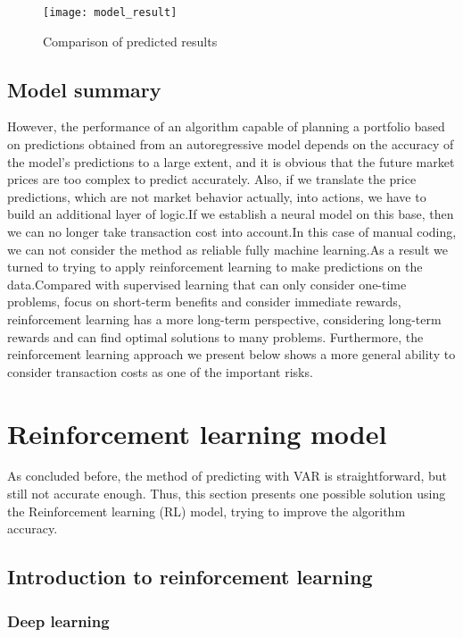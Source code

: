 \documentclass{mcmthesis}
\begin{document}
\begin{figure}[H]
  \centering
  \texttt{[image: model\_result]}
  \caption{Comparison of predicted results}
  \label{fig:prediction}
\end{figure}
\subsection{Model summary}
However, the performance of an algorithm capable of planning a portfolio based on predictions obtained from an autoregressive model depends on the accuracy of the model's predictions to a large extent, and it is obvious that the future market prices are too complex to predict accurately. Also, if we translate the price predictions, which are not market behavior actually, into actions, we have to build an additional layer of logic.If we establish a neural model on this base, then we can no longer take transaction cost into account.In this case of manual coding, we can not consider the method as reliable fully machine learning.As a result we turned to trying to apply reinforcement learning to make predictions on the data.Compared with supervised learning that can only consider one-time problems, focus on short-term benefits and consider immediate rewards, reinforcement learning has a more long-term perspective, considering long-term rewards and can find optimal solutions to many problems. Furthermore, the reinforcement learning approach we present below shows a more general ability to consider transaction costs as one of the important risks.


\section{Reinforcement learning model}

As concluded before,
the method of predicting with VAR is straightforward,
but still not accurate enough.
Thus, this section presents one possible solution using the Reinforcement learning (RL) model,
trying to improve the algorithm accuracy.

\subsection{Introduction to reinforcement learning}

\subsubsection{Deep learning}
\end{document}

